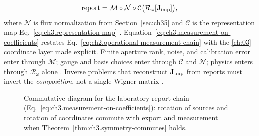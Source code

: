 \begin{equation}
\label{eq:ch3.measurement-on-coefficients}
\text{report}
=
\mathcal{M}\circ\mathcal{N}\circ\mathcal{C}\big(\mathcal{R}_\omega[\mathbf{J}_{\mathrm{imp}}]\big),
\end{equation}
where \(\mathcal{N}\) is flux normalization from Section~\ref{sec:ch35} and \(\mathcal{C}\) is the representation map Eq.~\eqref{eq:ch3.representation-map} . Equation~\eqref{eq:ch3.measurement-on-coefficients} restates Eq.~\eqref{eq:ch2.operational-measurement-chain} with the \ref{ch:03} coordinate layer made explicit. Finite aperture rank, noise, and calibration error enter through \(\mathcal{M}\); gauge and basis choices enter through \(\mathcal{C}\) and \(\mathcal{N}\); physics enters through \(\mathcal{R}_\omega\) alone . Inverse problems that reconstruct \(\mathbf{J}_{\mathrm{imp}}\) from reports must invert the \emph{composition}, not a single Wigner matrix .
\begin{figure}[t]
\centering
{}
\caption{Commutative diagram for the laboratory report chain
(Eq.~\eqref{eq:ch3.measurement-on-coefficients}): rotation of sources and rotation of
coordinates commute with export and measurement when
Theorem~\ref{thm:ch3.symmetry-commutes} holds.}
\label{fig:ch3.report-chain-commutative-diagram}
\end{figure}
